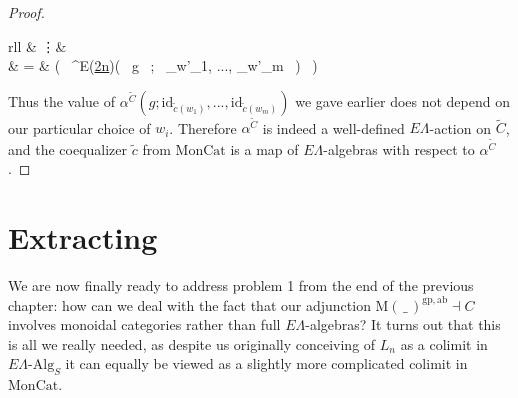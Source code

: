 \documentclass{amsbook} %
\newcommand{\ELnn}{E\Lambda(\underline{2n})}
\newenvironment{eq*}{\begin{equation*}}{\end{equation*}}
\numberwithin{section}{chapter}
\begin{document}
\begin{proof}
\begin{eq*}
\begin{array}{rll}
			& \vdots & \\
			& = & \big( \, \alpha^{\ELnn}( \, g \, ; \, _{w'_1}, ..., _{w'_m} \, ) \, \big)
		\end{array} 
\end{eq*}
Thus the value of $\alpha^{\tilde{C}}(g; \mathrm{id}_{\tilde{c}(w_1)}, ..., \mathrm{id}_{\tilde{c}(w_m)})$ we gave earlier does not depend on our particular choice of $w_i$. Therefore $\alpha^{\tilde{C}}$ is indeed a well-defined $E\Lambda$-action on $\tilde{C}$, and the coequalizer $\tilde{c}$ from $\mathrm{MonCat}$ is a map of $E\Lambda$-algebras with respect to $\alpha^{\tilde{C}}$.
\end{proof}

\section{Extracting %
}

We are now finally ready to address problem 1 from the end of the previous chapter: how can we deal with the fact that our adjunction $\mathrm{M}(\, \_ \,)^{\mathrm{gp},\mathrm{ab}} \dashv C$ involves monoidal categories rather than full $E\Lambda$-algebras? It turns out that this is all we really needed, as despite us originally conceiving of $L_n$ as a colimit in $E\Lambda\mbox{-}\mathrm{Alg}_S$ it can equally be viewed as a slightly more complicated colimit in $\mathrm{MonCat}$.
\end{document}
